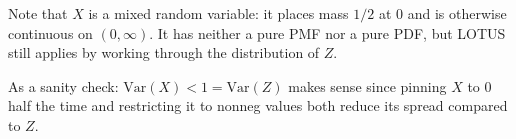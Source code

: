 \documentclass{article}
\begin{document}
Note that $X$ is a mixed random variable: it places mass $1/2$ at $0$ and is otherwise continuous on $(0,\infty)$. It has neither a pure PMF nor a pure PDF, but LOTUS still applies by working through the distribution of $Z$.

As a sanity check: $\text{Var}(X)<1=\text{Var}(Z)$ makes sense since pinning $X$ to $0$ half the time and restricting it to nonneg values both reduce its spread compared to $Z$.
\end{document}
